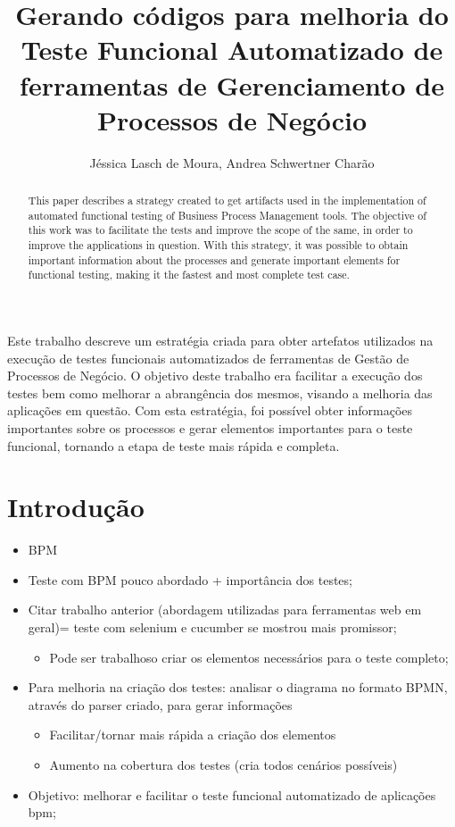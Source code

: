 \documentclass[12pt]{article}
\title{Gerando códigos para melhoria do Teste Funcional Automatizado de ferramentas de Gerenciamento de Processos de Negócio}
\author{Jéssica Lasch de Moura\inst{1}, Andrea Schwertner Charão\inst{1}}
\begin{document}
 

\maketitle

\begin{abstract}
This paper describes a strategy created to get artifacts used in the implementation of automated functional testing of Business Process Management tools. The objective of this work was to facilitate the tests and improve the scope of the same, in order to improve the applications in question. With this strategy, it was possible to obtain important information about the processes and generate important elements for functional testing, making it the fastest and most complete test case.
\end{abstract}
     
\begin{resumo} 
Este trabalho descreve um estratégia criada para obter artefatos utilizados na execução de testes funcionais automatizados de ferramentas de Gestão de Processos de Negócio. O objetivo deste trabalho era facilitar a execução dos testes bem como melhorar a abrangência dos mesmos, visando a melhoria das aplicações em questão. Com esta estratégia, foi possível obter informações importantes sobre os processos e gerar elementos importantes para o teste funcional, tornando a etapa de teste mais rápida e completa.
\end{resumo}

\section{Introdução}

 \begin{itemize}
   \item BPM
   \item Teste com BPM pouco abordado + importância dos testes;
   \item Citar trabalho anterior (abordagem utilizadas para ferramentas web em geral)= teste com selenium e cucumber se mostrou mais promissor;
   \begin{itemize}
	\item Pode ser trabalhoso criar os elementos necessários para o teste completo;
   \end{itemize}
   \item Para melhoria na criação dos testes: analisar o diagrama no formato BPMN, através do parser criado, para gerar informações
     \begin{itemize}
	\item Facilitar/tornar mais rápida a criação dos elementos
	\item Aumento na cobertura dos testes (cria todos cenários possíveis)
   \end{itemize}
   \item Objetivo:  melhorar e facilitar o teste funcional automatizado de aplicações bpm;
 \end{itemize}
 
\end{document}
